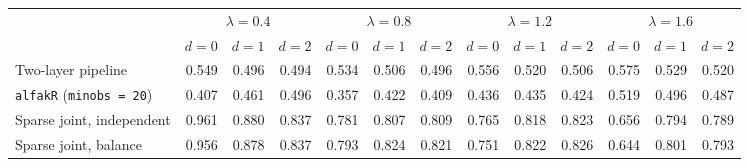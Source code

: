 \begin{center}
\footnotesize
\setlength{\tabcolsep}{3pt}
\begin{tabular}{l*{12}{r}}
\toprule
 & \multicolumn{3}{c}{$\lambda=0.4$} & \multicolumn{3}{c}{$\lambda=0.8$} & \multicolumn{3}{c}{$\lambda=1.2$} & \multicolumn{3}{c}{$\lambda=1.6$} \\
\cmidrule(lr){2-4}\cmidrule(lr){5-7}\cmidrule(lr){8-10}\cmidrule(lr){11-13}
 & $d=0$ & $d=1$ & $d=2$ & $d=0$ & $d=1$ & $d=2$ & $d=0$ & $d=1$ & $d=2$ & $d=0$ & $d=1$ & $d=2$ \\
\midrule
Two-layer pipeline & 0.549 & 0.496 & 0.494 & 0.534 & 0.506 & 0.496 & 0.556 & 0.520 & 0.506 & 0.575 & 0.529 & 0.520 \\
\texttt{alfakR} (\texttt{minobs = 20}) & 0.407 & 0.461 & 0.496 & 0.357 & 0.422 & 0.409 & 0.436 & 0.435 & 0.424 & 0.519 & 0.496 & 0.487 \\
Sparse joint, independent & 0.961 & 0.880 & 0.837 & 0.781 & 0.807 & 0.809 & 0.765 & 0.818 & 0.823 & 0.656 & 0.794 & 0.789 \\
Sparse joint, balance & 0.956 & 0.878 & 0.837 & 0.793 & 0.824 & 0.821 & 0.751 & 0.822 & 0.826 & 0.644 & 0.801 & 0.793 \\
\bottomrule
\end{tabular}
\end{center}
